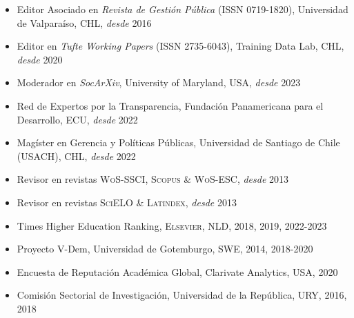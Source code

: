





\begin{publications}

\begin{itemize}
\item{\small Editor Asociado en {\itshape Revista de Gestión Pública} (ISSN 0719-1820), Universidad de Valparaíso, CHL, {\itshape desde} 2016}
\item{\small Editor en {\itshape Tufte Working Papers} (ISSN 2735-6043), Training Data Lab, CHL, {\itshape desde} 2020}
\item{\small Moderador en {\itshape SocArXiv}, University of Maryland, USA, {\itshape desde} 2023}
\item{\small Red de Expertos por la Transparencia, Fundación Panamericana para el Desarrollo, ECU, {\itshape desde} 2022}
\item{\small Magíster en Gerencia y Políticas Públicas, Universidad de Santiago de Chile (USACH), CHL, {\itshape desde} 2022}
\item{\small Revisor en revistas {\scshape WoS-SSCI}, {\scshape Scopus} \& {\scshape WoS-ESC}, {\itshape desde} 2013}
\item{\small Revisor en revistas {\scshape SciELO} \& {\scshape Latindex}, {\itshape desde} 2013}
\item{\small Times Higher Education Ranking, {\scshape Elsevier}, NLD, 2018, 2019, 2022-2023}
\item{\small Proyecto V-Dem, Universidad de Gotemburgo, SWE, 2014, 2018-2020}
\item{\small Encuesta de Reputación Académica Global, Clarivate Analytics, USA, 2020}
\item{\small Comisión Sectorial de Investigación, Universidad de la República, URY, 2016, 2018}
\end{itemize}

\vspace{1mm}
\end{publications}
